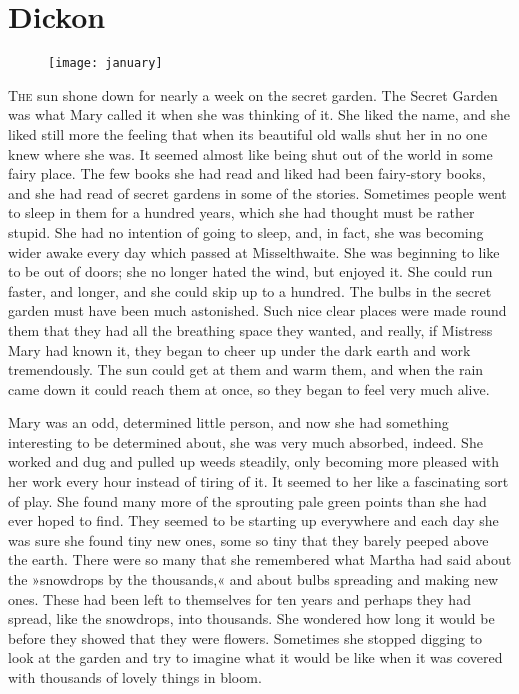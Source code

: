 \chapter{Dickon} 
\begin{figure}[t!]
\centering
\texttt{[image: january]}
\end{figure}

 \lettrine[lines=6]{T}{he} sun shone down for nearly a week on the secret garden. The Secret Garden was what Mary called it when she was thinking of it. She liked the name, and she liked still more the feeling that when its beautiful old walls shut her in no one knew where she was. It seemed almost like being shut out of the world in some fairy place. The few books she had read and liked had been fairy-story books, and she had read of secret gardens in some of the stories. Sometimes people went to sleep in them for a hundred years, which she had thought must be rather stupid. She had no intention of going to sleep, and, in fact, she was becoming wider awake every day which passed at Misselthwaite. She was beginning to like to be out of doors; she no longer hated the wind, but enjoyed it. She could run faster, and longer, and she could skip up to a hundred. The bulbs in the secret garden must have been much astonished. Such nice clear places were made round them that they had all the breathing space they wanted, and really, if Mistress Mary had known it, they began to cheer up under the dark earth and work tremendously. The sun could get at them and warm them, and when the rain came down it could reach them at once, so they began to feel very much alive.

Mary was an odd, determined little person, and now she had something interesting to be determined about, she was very much absorbed, indeed. She worked and dug and pulled up weeds steadily, only becoming more pleased with her work every hour instead of tiring of it. It seemed to her like a fascinating sort of play. She found many more of the sprouting pale green points than she had ever hoped to find. They seemed to be starting up everywhere and each day she was sure she found tiny new ones, some so tiny that they barely peeped above the earth. There were so many that she remembered what Martha had said about the »snowdrops by the thousands,« and about bulbs spreading and making new ones. These had been left to themselves for ten years and perhaps they had spread, like the snowdrops, into thousands. She wondered how long it would be before they showed that they were flowers. Sometimes she stopped digging to look at the garden and try to imagine what it would be like when it was covered with thousands of lovely things in bloom.

